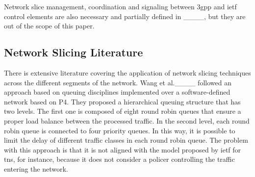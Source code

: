 Network slice management, coordination and signaling between \gls{3gpp} and \gls{ietf} control elements are also necessary and partially defined in ____, but they are out of the scope of this paper.

\subsection{Network Slicing Literature}
\label{subsec:soa-literature}
There is extensive literature covering the application of network slicing techniques across the different segments of the network. Wang et al.____ followed an approach based on queuing disciplines implemented over a software-defined network based on P4. They proposed a hierarchical queuing structure that has two levels. The first one is composed of eight round robin queues that ensure a proper load balance between the processed traffic. In the second level, each round robin queue is connected to four priority queues. In this way, it is possible to limit the delay of different traffic classes in each round robin queue. The problem with this approach is that it is not aligned with the model proposed by \gls{ietf} for \glspl{tn}, for instance, because it does not consider a policer controlling the traffic entering the network.

